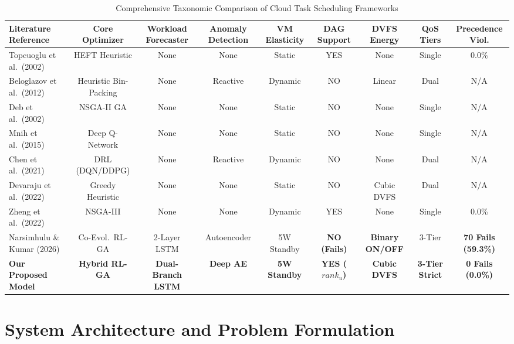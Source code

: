 \documentclass[default,sn-mathphys-num]{sn-jnl}
\theoremstyle{thmstyleone}
\theoremstyle{thmstyletwo}
\theoremstyle{thmstylethree}
\begin{document}
\begin{table}[t]
\caption{Comprehensive Taxonomic Comparison of Cloud Task Scheduling Frameworks}\label{tab:literature_taxonomy}
\centering
\scriptsize
\begin{tabular*}{\textwidth}{@{\extracolsep{\fill}}lcccccccc@{\extracolsep{\fill}}}
\toprule
\textbf{Literature Reference} & \textbf{Core Optimizer} & \textbf{Workload Forecaster} & \textbf{Anomaly Detection} & \textbf{VM Elasticity} & \textbf{DAG Support} & \textbf{DVFS Energy} & \textbf{QoS Tiers} & \textbf{Precedence Viol.} \\
\midrule
Topcuoglu et al.\ (2002) \cite{topcuoglu2002performance} & HEFT Heuristic & None & None & Static & YES & None & Single & 0.0\% \\
Beloglazov et al.\ (2012) \cite{beloglazov2012energy} & Heuristic Bin-Packing & None & Reactive & Dynamic & NO & Linear & Dual & N/A \\
Deb et al.\ (2002) \cite{deb2002fast} & NSGA-II GA & None & None & Static & NO & None & Single & N/A \\
Mnih et al.\ (2015) \cite{mnih2015human} & Deep Q-Network & None & None & Static & NO & None & Single & N/A \\
Chen et al.\ (2021) \cite{chen2021deep} & DRL (DQN/DDPG) & None & Reactive & Dynamic & NO & None & Dual & N/A \\
Devaraju et al.\ (2022) \cite{devaraju2022dvfs} & Greedy Heuristic & None & None & Static & NO & Cubic DVFS & Dual & N/A \\
Zheng et al.\ (2022) \cite{zheng2022multi} & NSGA-III & None & None & Dynamic & YES & None & Single & 0.0\% \\
Narsimhulu \& Kumar (2026) \cite{narsimhulu2026hybrid} & Co-Evol.\ RL-GA & 2-Layer LSTM & Autoencoder & 5W Standby & \textbf{NO (Fails)} & \textbf{Binary ON/OFF} & 3-Tier & \textbf{70 Fails (59.3\%)} \\
\textbf{Our Proposed Model} & \textbf{Hybrid RL-GA} & \textbf{Dual-Branch LSTM} & \textbf{Deep AE} & \textbf{5W Standby} & \textbf{YES ($rank_u$)} & \textbf{Cubic DVFS} & \textbf{3-Tier Strict} & \textbf{0 Fails (0.0\%)} \\
\bottomrule
\end{tabular*}
\end{table}

\section{System Architecture and Problem Formulation}\label{sec:system_model}
\end{document}
